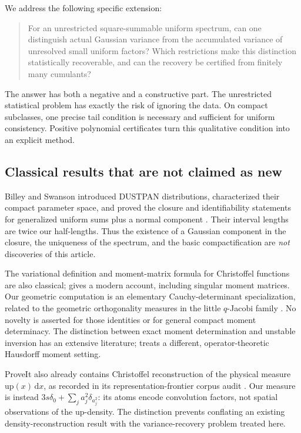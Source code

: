 \documentclass[11pt,letterpaper]{article}
\numberwithin{equation}{section}
\theoremstyle{definition}
\theoremstyle{remark}
\newcommand{\dd}{\,\mathrm d}
\begin{document}
We address the following specific extension:
\begin{quote}
For an unrestricted square-summable uniform spectrum, can one distinguish
actual Gaussian variance from the accumulated variance of unresolved small
uniform factors? Which restrictions make this distinction statistically
recoverable, and can the recovery be certified from finitely many cumulants?
\end{quote}
The answer has both a negative and a constructive part. The unrestricted
statistical problem has exactly the risk of ignoring the data. On compact
subclasses, one precise tail condition is necessary and sufficient for uniform
consistency. Positive polynomial certificates turn this qualitative condition
into an explicit method.

\subsection{Classical results that are not claimed as new}
Billey and Swanson introduced DUSTPAN distributions, characterized their
compact parameter space, and proved the closure and identifiability statements
for generalized uniform sums plus a normal component
\cite[Theorem~1.15, Theorem~3.13, Corollaries~3.28--3.29]{billey}.
Their interval lengths are twice our half-lengths. Thus the existence of a
Gaussian component in the closure, the uniqueness of the spectrum, and the
basic compactification are \emph{not} discoveries of this article.

The variational definition and moment-matrix formula for Christoffel functions
are also classical; \cite[Section~2.2]{christoffel} gives a modern account,
including singular moment matrices. Our geometric computation is an elementary
Cauchy-determinant specialization, related to the geometric orthogonality
measures in the little $q$-Jacobi family \cite[Section~18.27(iv)]{dlmfq}.
No novelty is asserted for those identities or for general compact moment
determinacy. The distinction between exact moment determination and unstable
inversion has an extensive literature; \cite{hausdorff} treats a different,
operator-theoretic Hausdorff moment setting.

ProveIt also already contains Christoffel reconstruction of the physical
measure $\mathrm{up}(x)\dd x$, as recorded in its representation-frontier
corpus audit \cite{native}. Our measure is instead
$3s\delta_0+\sum_j a_j^2\delta_{a_j^2}$: its atoms encode convolution
factors, not spatial observations of the up-density. The distinction prevents
conflating an existing density-reconstruction result with the variance-recovery
problem treated here.
\end{document}
